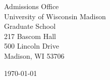 \begin{minipage}{0.49\textwidth}
\begin{flushleft}
\noindent
Admissions Office \\
University of Wisconsin Madison \\
Graduate School \\
217 Bascom Hall \\
500 Lincoln Drive \\
Madison, WI 53706 \\
\end{flushleft}
\end{minipage}
\begin{minipage}{0.47\textwidth}
\begin{flushright}
\today
\end{flushright}
\end{minipage} \\

\newcommand{\univ}{University of Wisconsin, Madison}
\newcommand{\univshort}{Wisconsin-Madison}
\newcommand{\degree}{Ph.D.}
\newcommand{\dept}{Computer Science}
